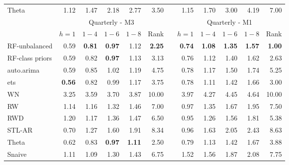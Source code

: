 \documentclass[11pt,a4paper,]{article}
\theoremstyle{definition}
\theoremstyle{definition}
\theoremstyle{definition}
\theoremstyle{remark}
\begin{document}
\begin{table}[!htbp]
\begin{tabular}{lrrrrrrrrrrr}
Theta                &       1.12 &       1.47 &       2.18 &       2.77 &       3.50 &            &       1.15 &       1.70 &       3.00 &       4.19 &       7.00 \\\cmidrule(lr){2-6} \cmidrule(lr){8-12}
           &                                 \multicolumn{ 5}{c}{Quarterly - M3} &            &                                 \multicolumn{ 5}{c}{Quarterly - M1} \\
                     &    $h=1$   &    $1-4$   &     $1-6$  &     $1-8$  &      Rank  &            &     $h=1$  &    $1-4$   &     $1-6$  &     $1-8$  &   Rank \\\cmidrule(lr){2-6} \cmidrule(lr){8-12}
RF-unbalanced        &       0.59 & {\bf 0.81} & {\bf 0.97} &       1.12 & {\bf 2.25} &            & {\bf 0.74} & {\bf 1.08} & {\bf 1.35} & {\bf 1.57} & {\bf 1.00} \\
RF-class priors      &       0.59 & 0.82 &       {\bf 0.97} &       1.13 &  3.13 &            &       0.76 &       1.12 &       1.40 &       1.62 &       2.63 \\
auto.arima           &       0.59 &       0.85 &       1.02 &       1.19 &       4.75 &            &       0.78 &       1.17 &       1.50 &       1.74 &       5.25 \\
ets                  & {\bf 0.56} &       0.82 &       0.99 &       1.17 &       3.75 &            &       0.78 &       1.11 &       1.42 &       1.66 &       3.00 \\
WN                   &       3.25 &       3.59 &       3.70 &       3.87 &      10.00 &            &       3.97 &       4.27 &       4.45 &       4.64 &      10.00 \\
RW                   &       1.14 &       1.16 &       1.32 &       1.46 &       7.00 &            &       0.97 &       1.35 &       1.67 &       1.95 &       7.50 \\
RWD                  &       1.20 &       1.17 &       1.36 &       1.47 &       6.50 &            &       0.95 &       1.26 &       1.56 &       1.81 &       5.38 \\
STL-AR               &       0.70 &       1.27 &       1.60 &       1.91 &       8.34 &            &       0.96 &       1.63 &       2.05 &       2.43 &       8.63 \\
Theta                &       0.62 &       0.83 &       {\bf 0.97} & {\bf 1.11} &  2.50 &            &       0.79 &       1.13 &       1.42 &       1.67 &       3.88 \\
Snaive               &       1.11 &       1.09 &       1.30 &       1.43 &       6.75 &            &       1.52 &       1.56 &       1.87 &       2.08 &       7.75 \\\cmidrule(lr){2-6} \cmidrule(lr){8-12}

\end{tabular}
\end{table}
\end{document}
